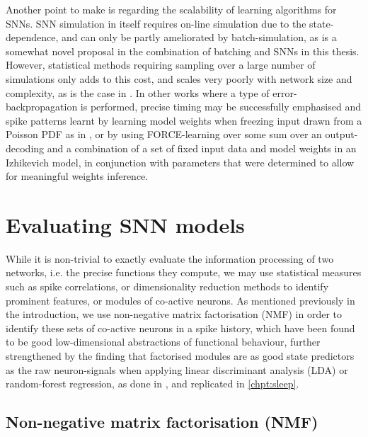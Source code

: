 \documentclass[mphil,deptreport,ianc]{infthesis} %
\begin{document}
Another point to make is regarding the scalability of learning algorithms for SNNs.
SNN simulation in itself requires on-line simulation due to the state-dependence, and can only be partly ameliorated by batch-simulation, as is a somewhat novel proposal in the combination of batching and SNNs in this thesis.
However, statistical methods requiring sampling over a large number of simulations only adds to this cost, and scales very poorly with network size and complexity, as is the case in \cite{Stringer2016InhibitoryNetworks}.
In other works where a type of error-backpropagation is performed, precise timing may be successfully emphasised and spike patterns learnt by learning model weights when freezing input drawn from a Poisson PDF as in \cite{Zenke2018}, or by using FORCE-learning over some sum over an output-decoding and a combination of a set of fixed input data and model weights in an Izhikevich model, in conjunction with parameters that were determined to allow for meaningful weights inference.


\section{Evaluating SNN models}


While it is non-trivial to exactly evaluate the information processing of two networks, i.e. the precise functions they compute, we may use statistical measures such as spike correlations, or dimensionality reduction methods to identify prominent features, or modules of co-active neurons.
As mentioned previously in the introduction, we use non-negative matrix factorisation (NMF) \cite{Seung1999, Seung2001} in order to identify these sets of co-active neurons in a spike history, which have been found to be good low-dimensional abstractions of functional behaviour, further strengthened by the finding that factorised modules are as good state predictors as the raw neuron-signals when applying linear discriminant analysis (LDA) or random-forest regression, as done in \cite{Onken2016a}, and replicated in \ref{chpt:sleep}.

\subsection{Non-negative matrix factorisation (NMF)}
\end{document}
